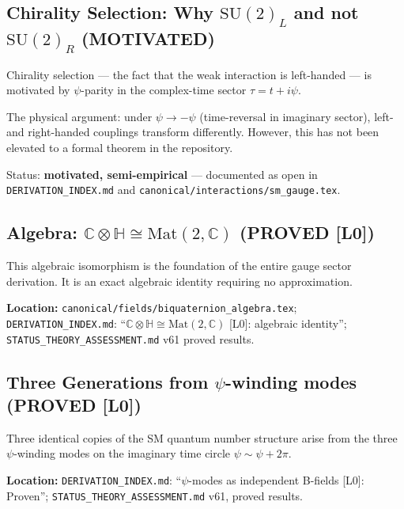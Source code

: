 \subsection{Chirality Selection: Why \texorpdfstring{$\mathrm{SU}(2)_L$}{SU(2)\_L} and not \texorpdfstring{$\mathrm{SU}(2)_R$}{SU(2)\_R} (MOTIVATED)}

\begin{tcolorbox}[colback=orange!10!white,colframe=orange!75!black,title=Motivated (not fully proved): chirality]
Chirality selection — the fact that the weak interaction is left-handed — is
motivated by $\psi$-parity in the complex-time sector $\tau = t + i\psi$.

The physical argument: under $\psi \to -\psi$ (time-reversal in imaginary sector),
left- and right-handed couplings transform differently. However, this has not been
elevated to a formal theorem in the repository.

Status: \textbf{motivated, semi-empirical} — documented as open in
\texttt{DERIVATION\_INDEX.md} and \texttt{canonical/interactions/sm\_gauge.tex}.
\end{tcolorbox}

\subsection{Algebra: \texorpdfstring{$\mathbb{C}\otimes\mathbb{H} \cong \mathrm{Mat}(2,\mathbb{C})$}{C⊗H ≅ Mat(2,C)} (PROVED [L0])}

This algebraic isomorphism is the foundation of the entire gauge sector derivation.
It is an exact algebraic identity requiring no approximation.

\textbf{Location:} \texttt{canonical/fields/biquaternion\_algebra.tex};
\texttt{DERIVATION\_INDEX.md}: ``$\mathbb{C}\otimes\mathbb{H} \cong \mathrm{Mat}(2,\mathbb{C})$
[L0]: algebraic identity''; \texttt{STATUS\_THEORY\_ASSESSMENT.md} v61 proved results.

\subsection{Three Generations from \texorpdfstring{$\psi$}{psi}-winding modes (PROVED [L0])}

Three identical copies of the SM quantum number structure arise from the three
$\psi$-winding modes on the imaginary time circle $\psi \sim \psi + 2\pi$.

\textbf{Location:} \texttt{DERIVATION\_INDEX.md}: ``$\psi$-modes as independent
B-fields [L0]: Proven''; \texttt{STATUS\_THEORY\_ASSESSMENT.md} v61, proved results.

